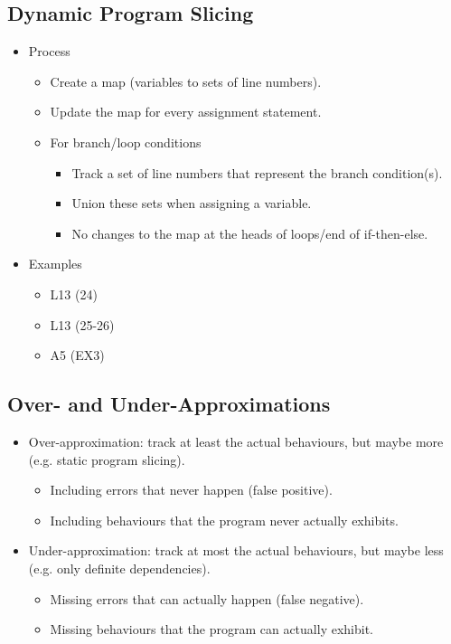 \documentclass{article}
\begin{document}
\subsection{Dynamic Program Slicing}

\begin{itemize}
    \item Process
    \begin{itemize}
        \item Create a map (variables to sets of line numbers).
        \item Update the map for every assignment statement.
        \item For branch/loop conditions
        \begin{itemize}
            \item Track a set of line numbers that represent the branch condition(s).
            \item Union these sets when assigning a variable.
            \item No changes to the map at the heads of loops/end of if-then-else.
        \end{itemize}
    \end{itemize}
    \item Examples
    \begin{itemize}
        \item L13 (24)
        \item L13 (25-26)
        \item A5 (EX3)
    \end{itemize}
\end{itemize}

\subsection{Over- and Under-Approximations}

\begin{itemize}
    \item Over-approximation: track at least the actual behaviours, but maybe more (e.g. static program slicing).
    \begin{itemize}
        \item Including errors that never happen (false positive).
        \item Including behaviours that the program never actually exhibits.
    \end{itemize}
    \item Under-approximation: track at most the actual behaviours, but maybe less (e.g. only definite dependencies).
    \begin{itemize}
        \item Missing errors that can actually happen (false negative).
        \item Missing behaviours that the program can actually exhibit.
    \end{itemize}
\end{itemize}
\end{document}
